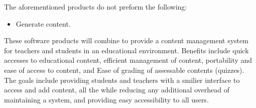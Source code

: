 \documentclass[]{article}
\begin{document}
The aforementioned products do not preform the following:
\begin{itemize}
  \item Generate content.
\end{itemize}

These software products will combine to provide a content management system for
teachers and students in an educational environment. Benefits include quick
accesses to educational content, efficient management of content, portability
and ease of access to content, and Ease of grading of assessable contents
(quizzes). The goals include providing students and teachers with a smilier
interface to access and add content, all the while reducing any additional
overhead of maintaining a system, and providing easy accessibility to all
users.
\end{document}
